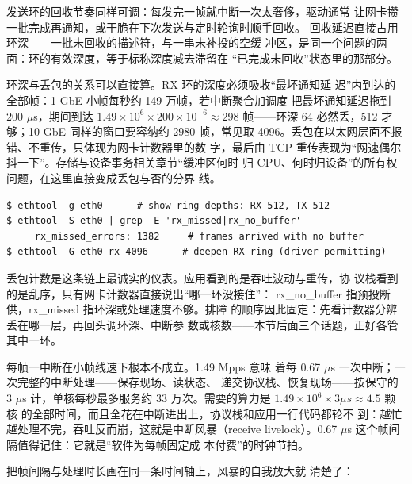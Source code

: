 发送环的回收节奏同样可调：每发完一帧就中断一次太奢侈，驱动通常
让网卡攒一批完成再通知，或干脆在下次发送与定时轮询时顺手回收。
回收延迟直接占用环深——一批未回收的描述符，与一串未补投的空缓
冲区，是同一个问题的两面：环的有效深度，等于标称深度减去滞留在
“已完成未回收”状态里的那部分。

环深与丢包的关系可以直接算。RX 环的深度必须吸收“最坏通知延
迟”内到达的全部帧：1 GbE 小帧每秒约 149 万帧，若中断聚合加调度
把最坏通知延迟拖到 200 $\mu$s，期间到达
$1.49\times10^{6}\times200\times10^{-6}\approx298$ 帧——环深 64
必然丢，512 才够；10 GbE 同样的窗口要容纳约 2980 帧，常见取
4096。丢包在以太网层面不报错、不重传，只体现为网卡计数器里的数
字，最后由 TCP 重传表现为“网速偶尔抖一下”。存储与设备事务相关章节“缓冲区何时
归 CPU、何时归设备”的所有权问题，在这里直接变成丢包与否的分界
线。

\begin{lstlisting}
$ ethtool -g eth0      # show ring depths: RX 512, TX 512
$ ethtool -S eth0 | grep -E 'rx_missed|rx_no_buffer'
     rx_missed_errors: 1382     # frames arrived with no buffer
$ ethtool -G eth0 rx 4096      # deepen RX ring (driver permitting)
\end{lstlisting}

丢包计数是这条链上最诚实的仪表。应用看到的是吞吐波动与重传，协
议栈看到的是乱序，只有网卡计数器直接说出“哪一环没接住”：
rx\_no\_buffer 指预投断供，rx\_missed 指环深或处理速度不够。排障
的顺序因此固定：先看计数器分辨丢在哪一层，再回头调环深、中断参
数或核数——本节后面三个话题，正好各管其中一环。

每帧一中断在小帧线速下根本不成立。1.49 Mpps 意味
着每 0.67 $\mu$s 一次中断；一次完整的中断处理——保存现场、读状态、
递交协议栈、恢复现场——按保守的 3 $\mu$s 计，单核每秒最多服务约 33
万次。需要的算力是 $1.49\times10^{6}\times3\mu s\approx4.5$ 颗核
的全部时间，而且全花在中断进出上，协议栈和应用一行代码都轮不
到：越忙越处理不完，吞吐反而崩，这就是中断风暴（receive
livelock）。0.67 $\mu$s 这个帧间隔值得记住：它就是“软件为每帧固定成
本付费”的时钟节拍。

把帧间隔与处理时长画在同一条时间轴上，风暴的自我放大就
清楚了：

